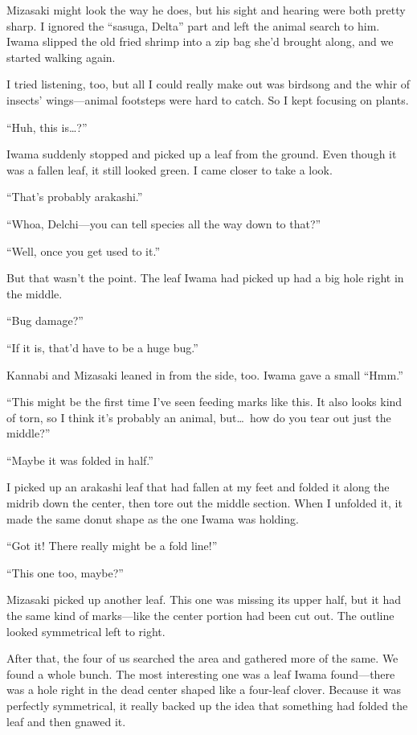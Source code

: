 \documentclass[
    a4paper,
    12pt,
    twoside,
    openany,
    UTF8,
    fontset=windows
]{ctexbook}
\begin{document}
Mizasaki might look the way he does, but his sight and hearing were both pretty sharp. I ignored the ``sasuga, Delta'' part and left the animal search to him. Iwama slipped the old fried shrimp into a zip bag she'd brought along, and we started walking again.

I tried listening, too, but all I could really make out was birdsong and the whir of insects' wings---animal footsteps were hard to catch. So I kept focusing on plants.

``Huh, this is\dots?''

Iwama suddenly stopped and picked up a leaf from the ground. Even though it was a fallen leaf, it still looked green. I came closer to take a look.

``That's probably arakashi.''

``Whoa, Delchi---you can tell species all the way down to that?''

``Well, once you get used to it.''

But that wasn't the point. The leaf Iwama had picked up had a big hole right in the middle.

``Bug damage?''

``If it is, that'd have to be a huge bug.''

Kannabi and Mizasaki leaned in from the side, too. Iwama gave a small ``Hmm.''

``This might be the first time I've seen feeding marks like this. It also looks kind of torn, so I think it's probably an animal, but\dots\ how do you tear out just the middle?''

``Maybe it was folded in half.''

I picked up an arakashi leaf that had fallen at my feet and folded it along the midrib down the center, then tore out the middle section. When I unfolded it, it made the same donut shape as the one Iwama was holding.

``Got it! There really might be a fold line!''

``This one too, maybe?''

Mizasaki picked up another leaf. This one was missing its upper half, but it had the same kind of marks---like the center portion had been cut out. The outline looked symmetrical left to right.

After that, the four of us searched the area and gathered more of the same. We found a whole bunch. The most interesting one was a leaf Iwama found---there was a hole right in the dead center shaped like a four-leaf clover. Because it was perfectly symmetrical, it really backed up the idea that something had folded the leaf and then gnawed it.
\end{document}

